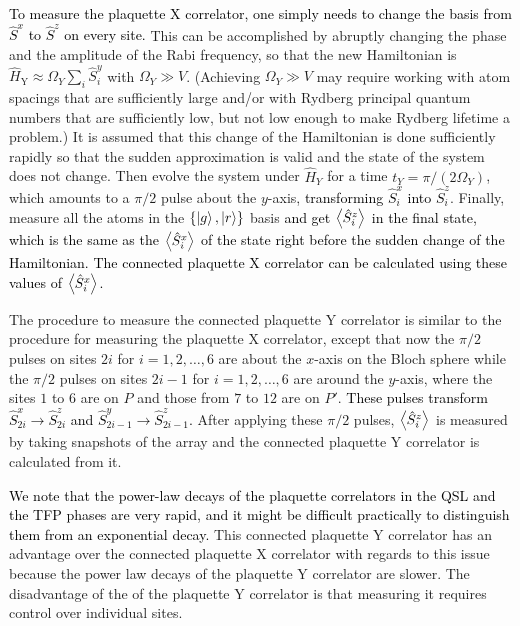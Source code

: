 \documentclass[twocolumn,superscriptaddress,amsmath,amssymb,aps,prx,nofootinbib]{revtex4-2}
\newcommand{\newtext}[1]{\textcolor{black}{#1}}
\begin{document}
\newtext{To measure the plaquette X correlator, one simply needs to change the basis from $\hat{S}^x$ to $\hat{S}^z$ on every site.} 
This can be accomplished by abruptly changing the phase and the amplitude of the Rabi frequency, so that the new Hamiltonian is $\hat{H}_\text{Y} \approx \Omega_Y \sum_i \hat{S}^y_i$ with $\Omega_Y \gg V$. 
(Achieving $\Omega_Y \gg V$ may require working with atom spacings that are sufficiently large and/or with Rydberg principal quantum numbers that are sufficiently low, but not low enough to make Rydberg lifetime a problem.) 
It is assumed that this change of the Hamiltonian is done sufficiently rapidly so that the sudden approximation is valid and the state of the system does not change.
Then evolve the system under $\hat{H}_Y$ for a time  $t_Y = \pi/(2 \Omega_Y)$, which amounts to a $\pi/2$ pulse about the $y$-axis,  \newtext{transforming $\hat{S}^x_i$ into $\hat{S}^z_i$}. 
Finally, measure all the atoms in the $\{\ket{g},\ket{r}\}$ basis \newtext{and get $\expval{ \hat{S}^z_i}$ in the final state, which is the same as the $\expval{ \hat{S}^x_i}$ of the state right before the sudden change of the Hamiltonian.
The connected plaquette X correlator can be calculated using these values of $\expval{\hat{S}_i^x}$.} 

The procedure to measure the connected plaquette Y correlator is similar to the procedure for measuring the plaquette X correlator, except that now the $\pi/2$ pulses on sites  $2i$ for $i= 1,2,\ldots,6$ are about the $x$-axis on the Bloch sphere while the $\pi/2$ pulses on  sites $2i-1$ for $i=1,2,\ldots,6$ are around the $y$-axis, where the sites $1$ to $6$ are on $P$ and those from $7$ to $12$ are on $P'$. 
\newtext{These pulses transform $\hat{S}_{2i}^{x} \rightarrow \hat{S}^{z}_{2i}$ and $\hat{S}_{2i-1}^{y} \rightarrow \hat{S}^{z}_{2i-1}$.}
After applying these $\pi/2$ pulses, $\expval{ \hat{S}_i^z}$ is measured by taking snapshots of the array and the connected plaquette Y correlator is calculated from it.

\newtext{We note that the power-law decays of the plaquette correlators in the QSL and the TFP phases are very rapid, and it might be difficult practically to distinguish them from an exponential decay.}
This connected plaquette Y correlator has an advantage over the connected plaquette X correlator with regards to this issue because the power law decays of the plaquette Y correlator are slower. The disadvantage of the of the plaquette Y correlator is that measuring it requires control over individual sites.
\end{document}
